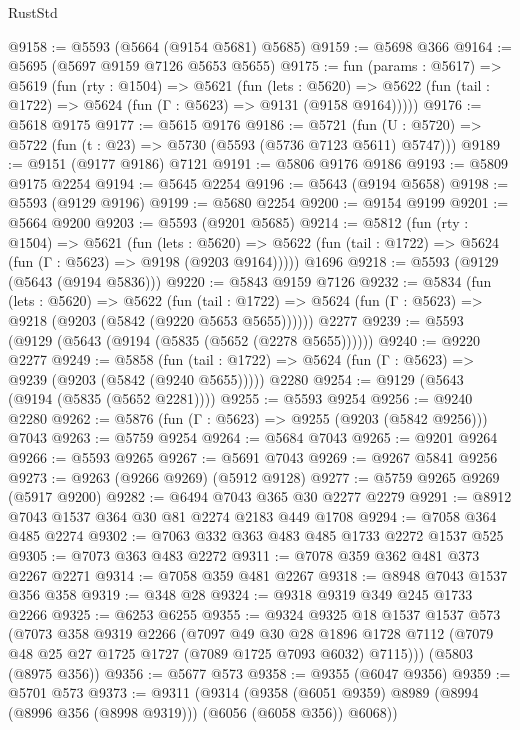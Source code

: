 \begin{lexlean}{RustStd}
\begin{coremodule}
@9158 := @5593 (@5664 (@9154 @5681) @5685)
@9159 := @5698 @366
@9164 := @5695 (@5697 @9159 @7126 @5653 @5655)
@9175 := fun (params : @5617) =>
  @5619
    (fun (rty : @1504) =>
    @5621
      (fun (lets : @5620) =>
      @5622 (fun (tail : @1722) => @5624 (fun (Γ : @5623) => @9131 (@9158 @9164)))))
@9176 := @5618 @9175
@9177 := @5615 @9176
@9186 := @5721 (fun (U : @5720) => @5722 (fun (t : @23) => @5730 (@5593 (@5736 @7123 @5611) @5747)))
@9189 := @9151 (@9177 @9186) @7121
@9191 := @5806 @9176 @9186
@9193 := @5809 @9175 @2254
@9194 := @5645 @2254
@9196 := @5643 (@9194 @5658)
@9198 := @5593 (@9129 @9196)
@9199 := @5680 @2254
@9200 := @9154 @9199
@9201 := @5664 @9200
@9203 := @5593 (@9201 @5685)
@9214 := @5812
    (fun (rty : @1504) =>
    @5621
      (fun (lets : @5620) =>
      @5622 (fun (tail : @1722) => @5624 (fun (Γ : @5623) => @9198 (@9203 @9164)))))
    @1696
@9218 := @5593 (@9129 (@5643 (@9194 @5836)))
@9220 := @5843 @9159 @7126
@9232 := @5834
    (fun (lets : @5620) =>
    @5622
      (fun (tail : @1722) => @5624 (fun (Γ : @5623) => @9218 (@9203 (@5842 (@9220 @5653 @5655))))))
    @2277
@9239 := @5593 (@9129 (@5643 (@9194 (@5835 (@5652 (@2278 @5655))))))
@9240 := @9220 @2277
@9249 := @5858
    (fun (tail : @1722) => @5624 (fun (Γ : @5623) => @9239 (@9203 (@5842 (@9240 @5655)))))
    @2280
@9254 := @9129 (@5643 (@9194 (@5835 (@5652 @2281))))
@9255 := @5593 @9254
@9256 := @9240 @2280
@9262 := @5876 (fun (Γ : @5623) => @9255 (@9203 (@5842 @9256))) @7043
@9263 := @5759 @9254
@9264 := @5684 @7043
@9265 := @9201 @9264
@9266 := @5593 @9265
@9267 := @5691 @7043
@9269 := @9267 @5841 @9256
@9273 := @9263 (@9266 @9269) (@5912 @9128)
@9277 := @5759 @9265 @9269 (@5917 @9200)
@9282 := @6494 @7043 @365 @30 @2277 @2279
@9291 := @8912 @7043 @1537 @364 @30 @81 @2274 @2183 @449 @1708
@9294 := @7058 @364 @485 @2274
@9302 := @7063 @332 @363 @483 @485 @1733 @2272 @1537 @525
@9305 := @7073 @363 @483 @2272
@9311 := @7078 @359 @362 @481 @373 @2267 @2271
@9314 := @7058 @359 @481 @2267
@9318 := @8948 @7043 @1537 @356 @358
@9319 := @348 @28
@9324 := @9318 @9319 @349 @245 @1733 @2266
@9325 := @6253 @6255
@9355 := @9324
    @9325
    @18
    @1537
    @1537
    @573
    (@7073
      @358
      @9319
      @2266
      (@7097
        @49
        @30
        @28
        @1896
        @1728
        @7112
        (@7079 @48 @25 @27 @1725 @1727 (@7089 @1725 @7093 @6032) @7115)))
    (@5803 (@8975 @356))
@9356 := @5677 @573
@9358 := @9355 (@6047 @9356)
@9359 := @5701 @573
@9373 := @9311
    (@9314
      (@9358 (@6051 @9359) @8989 (@8994 (@8996 @356 (@8998 @9319))) (@6056 (@6058 @356)) @6068))

\end{coremodule}
\end{lexlean}
